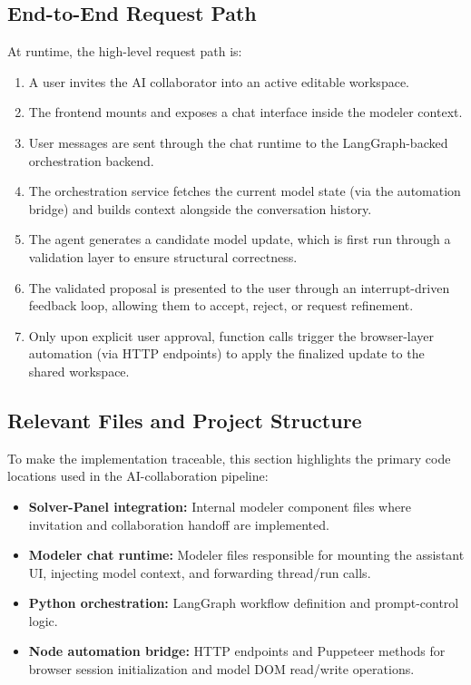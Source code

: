 \subsection{End-to-End Request Path}
At runtime, the high-level request path is:
\begin{enumerate}
    \item A user invites the AI collaborator into an active editable workspace.
    \item The frontend mounts and exposes a chat interface inside the modeler context.
    \item User messages are sent through the chat runtime to the LangGraph-backed orchestration backend.
    \item The orchestration service fetches the current model state (via the automation bridge) and builds context alongside the conversation history.
    \item The agent generates a candidate model update, which is first run through a validation layer to ensure structural correctness.
    \item The validated proposal is presented to the user through an interrupt-driven feedback loop, allowing them to accept, reject, or request refinement.
    \item Only upon explicit user approval, function calls trigger the browser-layer automation (via HTTP endpoints) to apply the finalized update to the shared workspace.
\end{enumerate}


\subsection{Relevant Files and Project Structure}
To make the implementation traceable, this section highlights the primary code locations used in the AI-collaboration pipeline:
\begin{itemize}
    \item \textbf{Solver-Panel integration:} Internal modeler component files where invitation and collaboration handoff are implemented.
    \item \textbf{Modeler chat runtime:} Modeler files responsible for mounting the assistant UI, injecting model context, and forwarding thread/run calls.
    \item \textbf{Python orchestration:} LangGraph workflow definition and prompt-control logic.
    \item \textbf{Node automation bridge:} HTTP endpoints and Puppeteer methods for browser session initialization and model DOM read/write operations.
\end{itemize}

